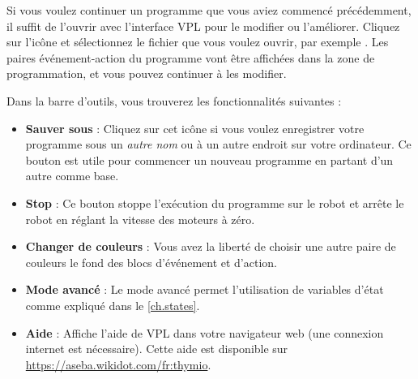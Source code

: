 Si vous voulez continuer un programme que vous aviez commencé précédemment, il suffit de l'ouvrir avec l'interface VPL pour le modifier ou l'améliorer.
Cliquez sur l'icône  et sélectionnez le fichier que vous voulez ouvrir, par exemple .
Les paires événement-action du programme vont être affichées dans la zone de programmation, et vous pouvez continuer à les modifier.


Dans la barre d'outils, vous trouverez les fonctionnalités suivantes :

\begin{itemize}

\item \textbf{Sauver sous}  :
Cliquez sur cet icône si vous voulez enregistrer votre programme sous un \emph{autre nom} ou à un autre endroit sur votre ordinateur.
Ce bouton est utile pour commencer un nouveau programme en partant d'un autre comme base.

\item \textbf{Stop}  : Ce bouton stoppe l'exécution du programme sur le robot et arrête le robot en réglant la vitesse des moteurs à zéro.

\item \textbf{Changer de couleurs}  : Vous avez la liberté de choisir une autre paire de couleurs le fond des blocs d'événement et d'action.

\item \textbf{Mode avancé}  : Le mode avancé permet l'utilisation de variables d'état comme expliqué dans le \cref{ch.states}.

\item \textbf{Aide}  : Affiche l'aide de VPL dans votre navigateur web (une connexion internet est nécessaire).
Cette aide est disponible sur \url{https://aseba.wikidot.com/fr:thymio}.

\end{itemize}
